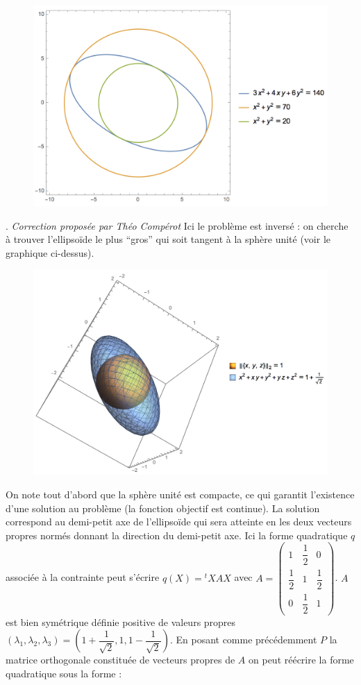 \documentclass{fancybook}
\begin{document}
\begin{figure}[h]
\includegraphics[scale=0.5]{images/2.png}
\centering 
\end{figure}
. \hfill \textit{Correction proposée par Théo Compérot}\newline
Ici le problème est inversé : on cherche à trouver l'ellipsoïde le plus ``gros'' qui soit tangent à la sphère unité (voir le graphique ci-dessus).\newline
\begin{figure}[t]
\includegraphics[scale=0.5]{images/3.png}
\centering 
\end{figure}
On note tout d'abord que la sphère unité est compacte, ce qui garantit l'existence d'une solution au problème (la fonction objectif est continue). La solution correspond au demi-petit axe de l'ellipsoïde qui sera atteinte en les deux vecteurs propres normés donnant la direction du demi-petit axe. Ici la forme quadratique $q$ associée à la contrainte peut s'écrire $q(X) = {}^t\! XAX$ avec $A =\begin{pmatrix} 1 & \dfrac{1}{2} & 0 \\ \dfrac{1}{2} & 1 & \dfrac{1}{2} \\ 0 & \dfrac{1}{2} & 1 \end{pmatrix}$. $A$ est bien symétrique définie positive de valeurs propres $(\lambda_1,\lambda_2,\lambda_3) = \left(1+ \dfrac{1}{\sqrt{2}}, 1 , 1-\dfrac{1}{\sqrt{2}} \right)$. En posant comme précédemment $P$ la matrice orthogonale constituée de vecteurs propres de $A$ on peut réécrire la forme quadratique sous la forme :
\end{document}
